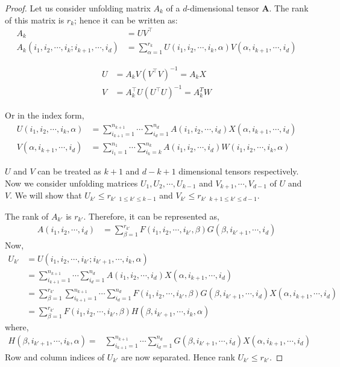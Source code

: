 \documentclass[runningheads]{llncs}
\newcommand{\tensor}[1]{\cal\textbf{#1}\xspace}
\begin{document}
\begin{proof}
	Let us consider unfolding matrix $A_k$ of a $d$-dimensional tensor \tensor{A}. The rank of this matrix is $r_k$; hence it can be written as:
	\begin{align*}
	A_k &= UV^\intercal\\
	A_k(i_1,i_2,\cdots,i_k;i_{k+1},\cdots, i_d) &= \sum_{\alpha=1}^{r_k} U(i_1,i_2,\cdots,i_k, \alpha)V(\alpha,i_{k+1},\cdots, i_d)
	\end{align*}
	
	
	\begin{align*}
	U &= A_k V(V^\intercal V)^{-1} = A_k X\\
	V &= A_k^\intercal U(U^\intercal U)^{-1} = A_k^T W
	\end{align*}
	
	\noindent Or in the index form,
	\begin{align*}
	U(i_1,i_2,\cdots, i_k, \alpha) &= \sum_{i_{k+1}=1}^{n_{k+1}}\cdots\sum_{i_d=1}^{n_d} A(i_1, i_2, \cdots, i_d) X(\alpha, i_{k+1},\cdots, i_d)\\
	V(\alpha, i_{k+1},\cdots, i_d) &= \sum_{i_1=1}^{n_1} \cdots \sum_{i_k=k}^{n_k} A(i_1, i_2, \cdots, i_d) W(i_1,i_2,\cdots, i_k, \alpha)
	\end{align*}
	
	\noindent $U$ and $V$ can be treated as $k+1$ and $d-k+1$ dimensional tensors respectively. Now we consider unfolding matrices $U_1, U_2, \cdots, U_{k-1}$ and $V_{k+1},\cdots, V_{d-1}$ of $U$ and $V$. We will show that $U_{k'} \le r_{k'}$ $_{1\le k' \le k-1}$ and $V_{k'}\le r_{k'}$ $_{k+1\le k' \le d-1}$.
	
	\noindent The rank of $A_{k'}$ is $r_{k'}$. Therefore, it can be represented as,
	\begin{align*}
	A(i_1, i_2, \cdots, i_d) &= \sum_{\beta=1}^{r_{k'}} F(i_1,i_2,\cdots ,i_{k'}, \beta) G(\beta, i_{k'+1},\cdots, i_d)
	\end{align*}
	Now, 
	\begin{align*}
	U_{k'} &= U(i_1,i_2, \cdots, i_{k'}; i_{k'+1},\cdots,i_k, \alpha)\\
	&= \sum_{i_{k+1}=1}^{n_{k+1}}\cdots\sum_{i_d=1}^{n_d} A(i_1, i_2, \cdots, i_d)X(\alpha, i_{k+1},\cdots, i_d)\\
	&= \sum_{\beta=1}^{r_{k'}}  \sum_{i_{k+1}=1}^{n_{k+1}}\cdots\sum_{i_d=1}^{n_d} F(i_1,i_2,\cdots ,i_{k'}, \beta) G(\beta, i_{k'+1},\cdots, i_d) X(\alpha, i_{k+1},\cdots, i_d)\\
	&= \sum_{\beta=1}^{r_{k'}} F(i_1,i_2,\cdots ,i_{k'}, \beta) H(\beta,i_{k'+1},\cdots, i_k, \alpha)
	\end{align*}
	\noindent where,
	\begin{align*}
	H(\beta,i_{k'+1},\cdots, i_k, \alpha) =& \sum_{i_{k+1}=1}^{n_{k+1}}\cdots\sum_{i_d=1}^{n_d} G(\beta, i_{k'+1},\cdots, i_d) X(\alpha, i_{k+1},\cdots, i_d)
	\end{align*}
	\noindent Row and column indices of $U_{k'}$ are now separated. Hence rank $U_{k'} \le r_{k'}$.
	

\end{proof}
\end{document}
